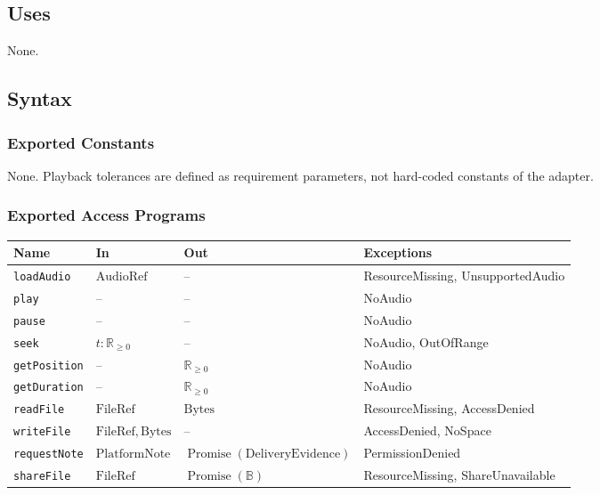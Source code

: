 \documentclass[12pt, titlepage]{article}
\begin{document}
\subsection{Uses}
None.

\subsection{Syntax}
\subsubsection{Exported Constants}
None. Playback tolerances are defined as requirement parameters,
not hard-coded constants of the adapter.

\subsubsection{Exported Access Programs}
\begin{center}
\small
\begin{tabularx}{\textwidth}{@{}p{}p{}p{}X@{}}
\toprule
\textbf{Name} & \textbf{In} & \textbf{Out} & \textbf{Exceptions}\\
\midrule
\texttt{loadAudio} & $\mathrm{AudioRef}$ & -- &
ResourceMissing, UnsupportedAudio\\
\texttt{play} & -- & -- & NoAudio\\
\texttt{pause} & -- & -- & NoAudio\\
\texttt{seek} & $t:\mathbb{R}_{\geq 0}$ & -- & NoAudio, OutOfRange\\
\texttt{getPosition} & -- & $\mathbb{R}_{\geq 0}$ & NoAudio\\
\texttt{getDuration} & -- & $\mathbb{R}_{\geq 0}$ & NoAudio\\
\texttt{readFile} & $\mathrm{FileRef}$ & $\mathrm{Bytes}$ &
ResourceMissing, AccessDenied\\
\texttt{writeFile} & $\mathrm{FileRef},\mathrm{Bytes}$ & -- &
AccessDenied, NoSpace\\
\texttt{requestNote} & $\mathrm{PlatformNote}$ &
$\operatorname{Promise}(\mathrm{DeliveryEvidence})$ &
PermissionDenied\\
\texttt{shareFile} & $\mathrm{FileRef}$ &
$\operatorname{Promise}(\mathbb{B})$ &
ResourceMissing, ShareUnavailable\\
\bottomrule
\end{tabularx}
\normalsize
\end{center}
\end{document}
